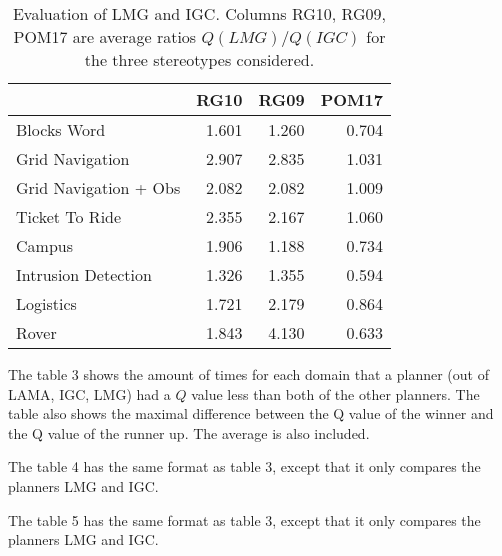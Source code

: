 \documentclass{article}
\begin{document}
\begin{table}[htbp]
\begin{tabular}{|l|r|r|r|}
\hline
 & \multicolumn{1}{l|}{RG10} & \multicolumn{1}{l|}{RG09} & \multicolumn{1}{l|}{POM17} \\ \hline
Blocks Word & 1.601 & 1.260 & 0.704 \\ \hline
Grid Navigation & 2.907 & 2.835 & 1.031 \\ \hline
Grid Navigation + Obs & 2.082 & 2.082 & 1.009 \\ \hline
Ticket To Ride & 2.355 & 2.167 & 1.060 \\ \hline
Campus & 1.906 & 1.188 & 0.734 \\ \hline
Intrusion Detection & 1.326 & 1.355 & 0.594 \\ \hline
Logistics & 1.721 & 2.179 & 0.864 \\ \hline
Rover & 1.843 & 4.130 & 0.633 \\ \hline
\end{tabular}
\label{LMG:IGC}
\caption{Evaluation of LMG and IGC. Columns RG10, RG09,
POM17 are average ratios $Q(LMG)/Q(IGC)$ for the three
stereotypes considered.}
\end{table}

The table 3 shows the amount of times for each domain that a planner (out of
LAMA, IGC, LMG) had a $Q$ value less than both of the other planners. The table also
shows the maximal difference between the Q value of the winner and the Q value of the
runner up. The average is also included.

The table 4 has the same format as table 3, except that it only
compares the planners LMG and IGC.

The table 5 has the same format as table 3, except that it only
compares the planners LMG and IGC.
\end{document}
